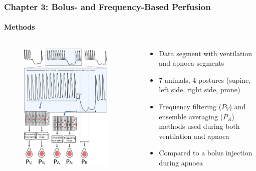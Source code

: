 \documentclass[10pt,    %
    english,            %
    xcolor=table,       %
    envcountsect,        %
    aspectratio=1610
]{beamer}
\begin{document}
\begin{frame}
	\frametitle{Chapter 3: Bolus- and Frequency-Based Perfusion}
	\framesubtitle{Methods}
	\begin{columns}[c]
		\begin{column}{0.5\textwidth}
	\begin{figure}
		\centering
	\includegraphics[width=0.9\textwidth,trim={0 0 0 3.35cm},clip]{imgs/fig-methodsOverview.pdf}
	\end{figure}
\end{column}
\begin{column}{0.5\textwidth}
	\begin{itemize}
		\item Data segment with ventilation and apnoea segments
		\item 7 animals, 4 postures (supine, left side, right side, prone)
		\item Frequency filtering ($P_V$) and ensemble averaging ($P_A$) methods used during both
		ventilation and apnoea
		\item Compared to a bolus injection during apnoea
	\end{itemize}
\end{column}
\end{columns}
\end{frame}
\end{document}
